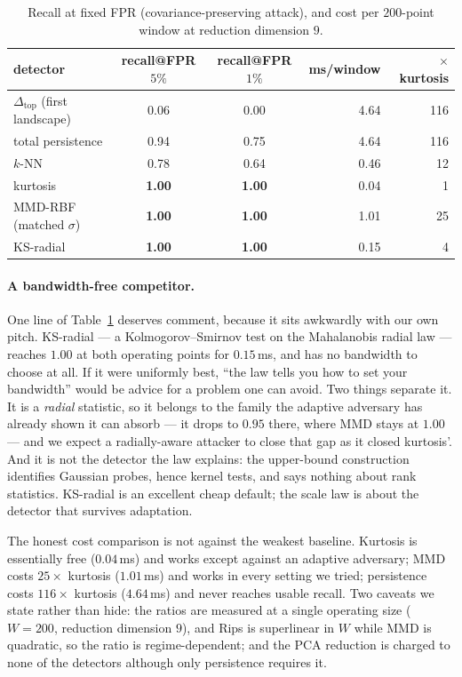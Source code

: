 \documentclass[11pt]{article}
\theoremstyle{remark}
\begin{document}
\begin{table}[t]\centering
\caption{Recall at fixed FPR (covariance-preserving attack), and cost per $200$-point window at
reduction dimension $9$.}
\label{tab:op}
\begin{tabular}{lccrr}
\toprule
detector & recall@FPR $5\%$ & recall@FPR $1\%$ & ms/window & $\times$ kurtosis\\
\midrule
$\Delta_{\mathrm{top}}$ (first landscape) & 0.06 & 0.00 & 4.64 & 116\\
total persistence & 0.94 & 0.75 & 4.64 & 116\\
$k$-NN & 0.78 & 0.64 & 0.46 & 12\\
kurtosis & \textbf{1.00} & \textbf{1.00} & 0.04 & 1\\
MMD-RBF (matched $\sigma$) & \textbf{1.00} & \textbf{1.00} & 1.01 & 25\\
KS-radial & \textbf{1.00} & \textbf{1.00} & 0.15 & 4\\
\bottomrule
\end{tabular}
\end{table}

\paragraph{A bandwidth-free competitor.} One line of Table~\ref{tab:op} deserves comment, because
it sits awkwardly with our own pitch. KS-radial --- a Kolmogorov--Smirnov test on the Mahalanobis
radial law --- reaches $1.00$ at both operating points for $0.15$\,ms, and has no bandwidth to
choose at all. If it were uniformly best, ``the law tells you how to set your bandwidth'' would be
advice for a problem one can avoid. Two things separate it. It is a \emph{radial} statistic, so it
belongs to the family the adaptive adversary has already shown it can absorb --- it drops to $0.95$
there, where MMD stays at $1.00$ --- and we expect a radially-aware attacker to close that gap as it
closed kurtosis'. And it is not the detector the law explains: the upper-bound construction
identifies Gaussian probes, hence kernel tests, and says nothing about rank statistics. KS-radial is
an excellent cheap default; the scale law is about the detector that survives adaptation.

The honest cost comparison is not against the weakest baseline. Kurtosis is essentially free
($0.04$\,ms) and works except against an adaptive adversary; MMD costs $25\times$ kurtosis
($1.01$\,ms) and works in every setting we tried; persistence costs $116\times$ kurtosis
($4.64$\,ms) and never reaches usable recall. Two caveats we state rather than hide: the ratios are
measured at a single operating size ($W=200$, reduction dimension $9$), and Rips is superlinear in
$W$ while MMD is quadratic, so the ratio is regime-dependent; and the PCA reduction is charged to
none of the detectors although only persistence requires it.
\end{document}
